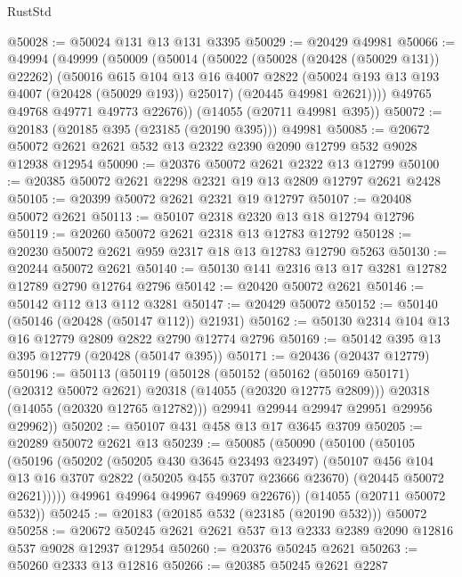 \begin{lexlean}{RustStd}
\begin{coremodule}
@50028 := @50024 @131 @13 @131 @3395
@50029 := @20429 @49981
@50066 := @49994
    (@49999
      (@50009
        (@50014
          (@50022
            (@50028 (@20428 (@50029 @131)) @22262)
            (@50016
              @615
              @104
              @13
              @16
              @4007
              @2822
              (@50024 @193 @13 @193 @4007 (@20428 (@50029 @193)) @25017)
              (@20445 @49981 @2621))))
        @49765
        @49768
        @49771
        @49773
        @22676))
    (@14055 (@20711 @49981 @395))
@50072 := @20183 (@20185 @395 (@23185 (@20190 @395))) @49981
@50085 := @20672 @50072 @2621 @2621 @532 @13 @2322 @2390 @2090 @12799 @532 @9028 @12938 @12954
@50090 := @20376 @50072 @2621 @2322 @13 @12799
@50100 := @20385 @50072 @2621 @2298 @2321 @19 @13 @2809 @12797 @2621 @2428
@50105 := @20399 @50072 @2621 @2321 @19 @12797
@50107 := @20408 @50072 @2621
@50113 := @50107 @2318 @2320 @13 @18 @12794 @12796
@50119 := @20260 @50072 @2621 @2318 @13 @12783 @12792
@50128 := @20230 @50072 @2621 @959 @2317 @18 @13 @12783 @12790 @5263
@50130 := @20244 @50072 @2621
@50140 := @50130 @141 @2316 @13 @17 @3281 @12782 @12789 @2790 @12764 @2796
@50142 := @20420 @50072 @2621
@50146 := @50142 @112 @13 @112 @3281
@50147 := @20429 @50072
@50152 := @50140 (@50146 (@20428 (@50147 @112)) @21931)
@50162 := @50130 @2314 @104 @13 @16 @12779 @2809 @2822 @2790 @12774 @2796
@50169 := @50142 @395 @13 @395 @12779 (@20428 (@50147 @395))
@50171 := @20436 (@20437 @12779)
@50196 := @50113
    (@50119
      (@50128
        (@50152
          (@50162 (@50169 @50171) (@20312 @50072 @2621) @20318 (@14055 (@20320 @12775 @2809)))
          @20318
          (@14055 (@20320 @12765 @12782)))
        @29941
        @29944
        @29947
        @29951
        @29956
        @29962))
@50202 := @50107 @431 @458 @13 @17 @3645 @3709
@50205 := @20289 @50072 @2621 @13
@50239 := @50085
    (@50090
      (@50100
        (@50105
          (@50196
            (@50202
              (@50205 @430 @3645 @23493 @23497)
              (@50107
                @456
                @104
                @13
                @16
                @3707
                @2822
                (@50205 @455 @3707 @23666 @23670)
                (@20445 @50072 @2621)))))
        @49961
        @49964
        @49967
        @49969
        @22676))
    (@14055 (@20711 @50072 @532))
@50245 := @20183 (@20185 @532 (@23185 (@20190 @532))) @50072
@50258 := @20672 @50245 @2621 @2621 @537 @13 @2333 @2389 @2090 @12816 @537 @9028 @12937 @12954
@50260 := @20376 @50245 @2621
@50263 := @50260 @2333 @13 @12816
@50266 := @20385 @50245 @2621 @2287

\end{coremodule}
\end{lexlean}
